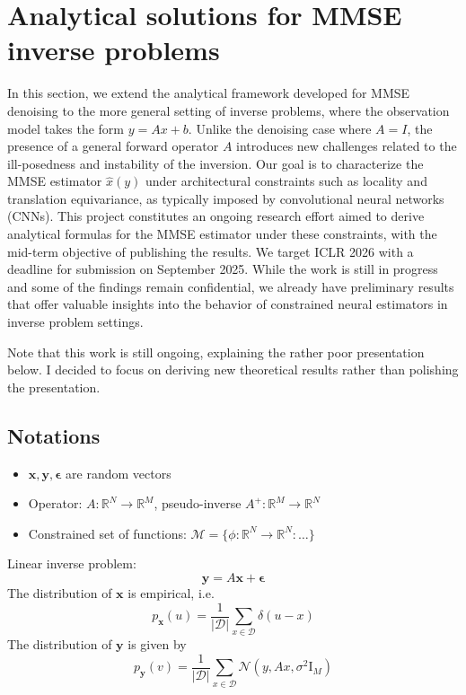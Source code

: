 \documentclass[a4paper,10pt]{article}
\theoremstyle{definition} %
\theoremstyle{definition} %
\theoremstyle{definition} %
\theoremstyle{definition} %
\newcommand{\R}{\mathbb{R}}
\newcommand{\Normal}[1]{\mathcal{N}\left( {#1} \right)}
\newcommand{\Id}{\mathrm{I}}
\newcommand{\M}{\mathcal{M}}
\newcommand{\x}{\boldsymbol{x}}
\newcommand{\beps}{\boldsymbol{\epsilon}}
\newcommand{\y}{\boldsymbol{y}}
\newcommand{\0}{\boldsymbol{0}}
\newcommand{\D}{\mathcal{D}}
\begin{document}
\section{Analytical solutions for MMSE inverse problems}
In this section, we extend the analytical framework developed for MMSE denoising to the more general setting of inverse problems, where the observation model takes the form $y=Ax+b$. Unlike the denoising case where $A=I$, the presence of a general forward operator $A$ introduces new challenges related to the ill-posedness and instability of the inversion. Our goal is to characterize the MMSE estimator $\hat{x}(y)$ under architectural constraints such as locality and translation equivariance, as typically imposed by convolutional neural networks (CNNs). This project constitutes an ongoing research effort aimed to derive analytical formulas for the MMSE estimator under these constraints, with the mid-term objective of publishing the results. We target ICLR 2026 with a deadline for submission on September 2025. While the work is still in progress and some of the findings remain confidential, we already have preliminary results that offer valuable insights into the behavior of constrained neural estimators in inverse problem settings.

Note that this work is still ongoing, explaining the rather poor presentation below. I decided to focus on deriving new theoretical results rather than polishing the presentation. 

\subsection{Notations}
\begin{itemize}
    \item[]  $\x, \y, \beps$ are random vectors 
    \item[] Operator: $A: \R^N \to \R^M$, pseudo-inverse $A^+ : \R^M \to \R^N$
    \item[] Constrained set of functions: $\M = \{ \phi : \R^N \to \R^N: \dots \}$
\end{itemize}
Linear inverse problem:
\begin{equation*}
   \y = A \x + \beps 
\end{equation*}
The distribution of $\x$ is empirical, i.e.
\begin{equation}
    p_{\x}(u) =  \frac{1}{|\D|}\sum_{x\in\D} \delta(u-x)
\end{equation}
The distribution of $\y$ is given by
\begin{equation*}
    p_{\y}(v) = \frac{1}{|\D|}\sum_{x\in\D} \Normal{y,Ax,\sigma^2\Id_M}
\end{equation*}
\end{document}

